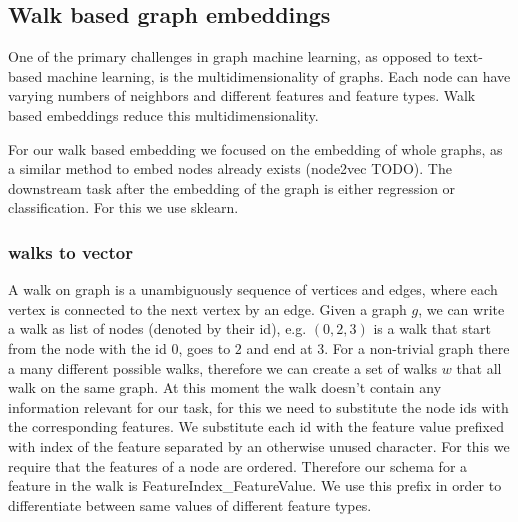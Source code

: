 \subsection{Walk based graph embeddings}

One of the primary challenges in graph machine learning, as opposed to text-based machine learning, is the multidimensionality of graphs. Each node can have varying numbers of neighbors and different features and feature types. Walk based embeddings reduce this multidimensionality.

For our walk based embedding we focused on the embedding of whole graphs, as a similar method to embed nodes already exists (node2vec TODO). The downstream task after the embedding of the graph is either regression or classification. For this we use sklearn.

\subsubsection{walks to vector}
A walk on graph is a unambiguously sequence of vertices and edges, where each vertex is connected to the next vertex by an edge. Given a graph $g$, we can write a walk as list of nodes (denoted by their id), e.g. $(0, 2, 3)$ is a walk that start from the node with the id $0$, goes to $2$ and end at $3$. For a non-trivial graph there a many different possible walks, therefore we can create a set of walks $w$ that all walk on the same graph. At this moment the walk doesn't contain any information relevant for our task, for this we need to substitute the node ids with the corresponding features. We substitute each id with the feature value prefixed with index of the feature separated by an otherwise unused character. For this we require that the features of a node are ordered. Therefore our schema for a feature in the walk is FeatureIndex\_FeatureValue. We use this prefix in order to differentiate between same values of different feature types.

